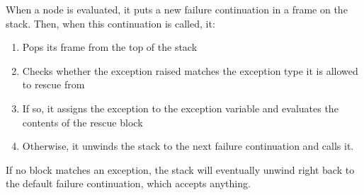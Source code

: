 When a  node is evaluated, it puts a new failure continuation in a frame on the stack. Then, when this continuation is called, it:

\begin{enumerate}
  \item Pops its frame from the top of the stack
  \item Checks whether the exception raised matches the exception type it is allowed to rescue from
  \item If so, it assigns the exception to the exception variable and evaluates the contents of the rescue block
  \item Otherwise, it unwinds the stack to the next failure continuation and calls it.
\end{enumerate}

If no  block matches an exception, the stack will eventually unwind right back to the default failure continuation, which accepts anything.
